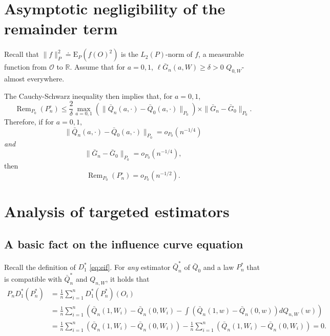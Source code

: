 \documentclass[
  11pt,
  openright,twoside]{book}
\DeclareMathOperator{\Rem}{Rem}
\newcommand{\bbR}{\mathbb{R}}
\newcommand{\defq}{\doteq}
\newcommand{\calO}{\mathcal{O}}
\newcommand{\Exp}{\textrm{E}}
\newcommand{\Gbar}{\bar{G}}
\newcommand{\Phat}{P^{\circ}}
\newcommand{\Qbar}{\bar{Q}}
\theoremstyle{definition}
\theoremstyle{definition}
\theoremstyle{definition}
\theoremstyle{definition}
\theoremstyle{remark}
\begin{document}
\hypertarget{asymp-neglig-remain}{%
\section{Asymptotic negligibility of the remainder term}\label{asymp-neglig-remain}}

Recall that \(\|f\|_{P}^{2} \defq \Exp_{P} \left( f(O)^{2} \right)\) is the
\(L_2(P)\)-norm of \(f\), a measurable function from \(\calO\) to \(\bbR\). Assume
that for \(a= 0,1\), \(\ell\Gbar_{n}(a,W) \geq \delta > 0\) \(Q_{0,W}\)-almost
everywhere.

The Cauchy-Schwarz inequality then implies that, for \(a = 0,1\),
\begin{equation*}\Rem_{P_0}(\Phat_n)   \le   \frac{2}{\delta}   \max_{a=0,1}
\left(  \|\Qbar_n   (a,\cdot)  -  \Qbar_0  (a,\cdot)\|_{P_0}   \right)  \times
\|\Gbar_n  -   \Gbar_0\|_{P_0}.\end{equation*} Therefore, if for \(a=0,1\),
\begin{equation*}\|\Qbar_n(a,\cdot)      -     \Qbar_0(a,\cdot)\|_{P_0}      =
o_{P_0}(n^{-1/4})\end{equation*} \emph{and} \begin{equation*}\|\Gbar_n     -
\Gbar_0\|_{P_0}        =         o_{P_0}(n^{-1/4}),\end{equation*} then
\begin{equation*}\Rem_{P_0}(\Phat_n) = o_{P_0}(n^{-1/2}).\end{equation*}

\hypertarget{analysis-TMLE}{%
\section{Analysis of targeted estimators}\label{analysis-TMLE}}

\hypertarget{basic-eic-eq}{%
\subsection{A basic fact on the influence curve equation}\label{basic-eic-eq}}

Recall the definition of \(D_{1}^{*}\) \eqref{eq:eif}. For \emph{any} estimator
\(\Qbar_n^*\) of \(\Qbar_0\) and a law \(P_n^{*}\) that is compatible with
\(\Qbar_n^*\) and \(Q_{n,W}\), it holds that
\begin{align*}
P_n D_1^*(P_n^*) 
&= \frac{1}{n} \sum_{i=1}^n D_1^{*}(P_n^*)(O_i)\\ 
&=\frac{1}{n}  \sum_{i=1}^n  \left(  \Qbar_n(1,W_i)   -  \Qbar_n(0,W_i)  -  \int
\left(\Qbar_n(1,w) - \Qbar_n(0,w)\right) dQ_{n,W}(w) \right) \\ 
&=   \frac{1}{n}\sum_{i=1}^n \left( \Qbar_n(1,W_i)  - \Qbar_n(0,W_i)\right) - \frac{1}{n}\sum_{i=1}^n
\left(\Qbar_n(1,W_i) - \Qbar_n(0,W_i)\right) = 0.
\end{align*}
\end{document}
